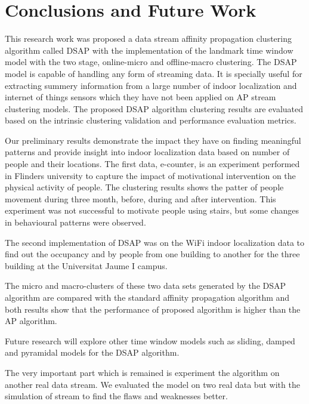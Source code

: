 \setlength{\parindent}{2em}

% 
\chapter{Conclusions and Future Work}

This research work was proposed a data stream affinity propagation clustering algorithm called DSAP with the implementation of the landmark time window model with the two stage, online-micro and offline-macro clustering. The DSAP model is capable of handling any form of streaming data. It is specially useful for extracting summery information from a large number of indoor localization and internet of things sensors which they have not been applied on AP stream clustering models.
The proposed DSAP algorithm clustering results are evaluated based on the intrinsic clustering validation and performance evaluation metrics.  

Our preliminary results demonstrate the impact they have on finding meaningful patterns and provide insight into indoor localization data based on number of people and their locations. The first data, e-counter, is an experiment performed in Flinders university to capture the impact of motivational intervention on the physical activity of people. The clustering results shows the patter of people movement during three month, before, during and after intervention. This experiment was not successful to motivate people using stairs, but some changes in behavioural patterns were observed. 

The second implementation of DSAP was on the WiFi indoor localization data to find out the occupancy and by people from one building to another for the three building at the Universitat Jaume I campus.

The micro and macro-clusters of these two data sets generated by the DSAP algorithm are compared with the standard affinity propagation algorithm and both results show that the performance of proposed algorithm is higher than the AP algorithm.

Future research will explore other time window models such as sliding, damped and pyramidal models for the DSAP algorithm.  

The very important part which is remained is experiment the algorithm on another real data stream. We evaluated the model on two real data but with the simulation of stream to find the flaws and weaknesses better.

